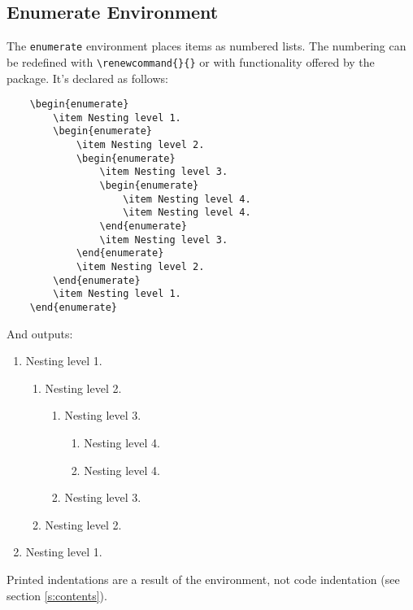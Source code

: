 \subsection{Enumerate Environment}
%
The \verb|enumerate| environment places items as numbered lists.  The
numbering can be redefined with \verb|\renewcommand{}{}| or with
functionality offered by the  package.  It's declared
as follows:
\begin{verbatim}
	\begin{enumerate}
    	\item Nesting level 1.
	    \begin{enumerate}
    	    \item Nesting level 2.
        	\begin{enumerate}
            	\item Nesting level 3.
	            \begin{enumerate}
    	            \item Nesting level 4.
        	        \item Nesting level 4.
	            \end{enumerate}
    	        \item Nesting level 3.
        	\end{enumerate}
	        \item Nesting level 2.
    	\end{enumerate}
	    \item Nesting level 1.
	\end{enumerate}
\end{verbatim}
And outputs:
\begin{enumerate}
\item Nesting level 1.
  \begin{enumerate}
  \item Nesting level 2.
    \begin{enumerate}
    \item Nesting level 3.
      \begin{enumerate}
      \item Nesting level 4.
      \item Nesting level 4.
      \end{enumerate}
    \item Nesting level 3.
    \end{enumerate}
  \item Nesting level 2.
  \end{enumerate}
\item Nesting level 1.
\end{enumerate}
Printed indentations are a result of the environment, not code
indentation (see section \ref{s:contents}).
%
